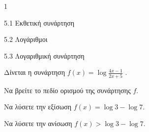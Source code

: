 \begin{ylh}{1}
\item 5.1 Εκθετική συνάρτηση
\item 5.2 Λογάριθμοι
\item 5.3 Λογαριθμική συνάρτηση
\end{ylh}
Δίνεται η συνάρτηση $f(x) = \log\frac{4x - 1}{2x + 5}$ .
\begin{alist}
\item Να βρείτε το πεδίο ορισμού της συνάρτησης $f$.
\item Να λύσετε την εξίσωση $f(x) = \log 3 - \log 7$.
\item Να λύσετε την ανίσωση $f(x) > \log 3 - \log 7$.
\end{alist}


